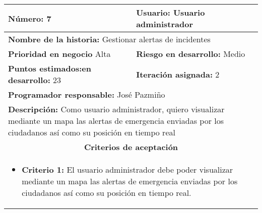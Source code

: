 \begin{longtable}{|p{6.7cm}|p{6.7cm}|}
    \textbf{Número:} 7                                   & \textbf{Usuario:} Usuario administrador                                                                                                               \\
    \hline
    \multicolumn{2}{|l|}{\textbf{Nombre de la historia:} Gestionar alertas de incidentes}                                                                                                                        \\
    \hline
    \textbf{Prioridad en negocio}  Alta                  & \textbf{Riesgo en desarrollo:} Medio                                                                                                                  \\
    \hline
    \textbf{\textbf{Puntos estimados:}en desarrollo:} 23 & \textbf{Iteración asignada:} 2                                                                                                                        \\
    \hline
    \multicolumn{2}{|l|}{\textbf{Programador responsable:} José Pazmiño }                                                                                                                                        \\
    \hline
    \multicolumn{2}{|p{13.4cm}|}{\textbf{Descripción:} Como usuario administrador, quiero visualizar mediante un mapa las alertas de emergencia enviadas por los ciudadanos así como su posición en tiempo real} \\
    \hline
    \multicolumn{2}{|c|}{\textbf{Criterios de aceptación}}                                                                                                                                                       \\
    \hline
    \multicolumn{2}{|p{13.4cm}|}{
    \begin{itemize}[label={},leftmargin=*, nosep]
        \item \textbf{Criterio 1:} El usuario administrador debe poder visualizar mediante un mapa las alertas de emergencia enviadas por los ciudadanos así como su posición en tiempo real.
    \end{itemize}
    }                                                                                                                                                                                                            \\
\end{longtable}



